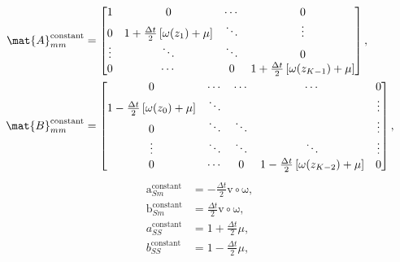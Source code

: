 \documentclass{jpmarticle}
\renewcommand{\vec}[1]{\boldsymbol{\mathrm{#1}}}
\begin{document}
\begin{equation}
  \begin{split}
    \mat{A}_{mm}^{\text{constant}} &=
    \begin{bmatrix}
      1 & 0 & \cdots & 0
      \\
      0 & 1 + \frac{\Delta t}{2} \left[\omega(z_1) + \mu\right] &
      \ddots & \vdots
      \\
      \vdots & \ddots & \ddots & 0
      \\
      0 & \cdots & 0 &
      1 + \frac{\Delta t}{2} \left[\omega(z_{K - 1}) + \mu\right]
    \end{bmatrix},
    \\
    \mat{B}_{mm}^{\text{constant}} &=
    \begin{bmatrix}
      0 & \cdots & \cdots & \cdots & 0
      \\
      1 - \frac{\Delta t}{2} \left[\omega(z_0) + \mu\right] & \ddots &
      & & \vdots
      \\
      0 & \ddots & \ddots & & \vdots
      \\
      \vdots & \ddots & \ddots & \ddots & \vdots
      \\
      0 & \cdots & 0 &
      1 - \frac{\Delta t}{2} \left[\omega(z_{K - 2}) + \mu\right] & 0
    \end{bmatrix},
  \end{split}
\end{equation}
\begin{equation}
  \begin{split}
    \vec{a}_{Sm}^{\text{constant}} &=
    - \frac{\Delta t}{2} \vec{v} \circ \vec{\omega},
    \\
    \vec{b}_{Sm}^{\text{constant}} &=
    \frac{\Delta t}{2} \vec{v} \circ \vec{\omega},
    \\
    a_{SS}^{\text{constant}} &=
    1 + \frac{\Delta t}{2} \mu,
    \\
    b_{SS}^{\text{constant}} &=
    1 - \frac{\Delta t}{2} \mu,
  \end{split}
\end{equation}
\end{document}
